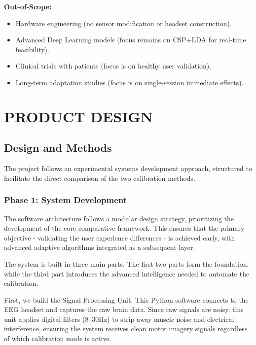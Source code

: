 \documentclass[a4paper, 11pt, openany]{report}
\begin{document}
    \textbf{Out-of-Scope:}
    \begin{itemize}
        \item Hardware engineering (no sensor modification or headset construction).
        \item Advanced Deep Learning models (focus remains on CSP+LDA for real-time feasibility).
        \item Clinical trials with patients (focus is on healthy user validation).
        \item Long-term adaptation studies (focus is on single-session immediate effects).
    \end{itemize}

\chapter{PRODUCT DESIGN}

    \section{Design and Methods}
    The project follows an experimental systems development approach, structured 
    to facilitate the direct comparison of the two calibration methods.

    \subsection{Phase 1: System Development}
    The software architecture follows a modular design strategy, prioritizing 
    the development of the core comparative framework. This ensures that the 
    primary objective - validating the user experience differences - is achieved 
    early, with advanced adaptive algorithms integrated as a subsequent layer.
    
    The system is built in three main parts. The first two parts form the 
    foundation, while the third part introduces the advanced intelligence 
    needed to automate the calibration.

    First, we build the Signal Processing Unit. This Python software 
    connects to the EEG headset and captures the raw brain data. Since raw 
    signals are noisy, this unit applies digital filters (8–30Hz) to strip 
    away muscle noise and electrical interference, ensuring the system receives 
    clean motor imagery signals regardless of which calibration mode is active.
    
\end{document}

